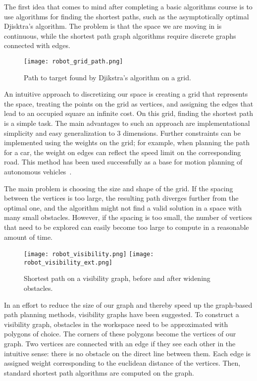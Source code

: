 The first idea that comes to mind after completing a basic algorithms course is to use algorithms for finding the shortest paths, such as the asymptotically optimal Djisktra's algorithm. The problem is that the space we are moving in is continuous, while the shortest path graph algorithms require discrete graphs connected with edges.

\begin{figure}[ht]
    \centering
    \texttt{[image: robot\_grid\_path.png]}
  \caption{Path to target found by Djikstra's algorithm on a grid.}\label{fig:grid}
\end{figure}

An intuitive approach to discretizing our space is creating a grid that represents the space, treating the points on the grid as vertices, and assigning the edges that lead to an occupied square an infinite cost. On this grid, finding the shortest path is a simple task. The main advantages to such an approach are implementational simplicity and easy generalization to 3 dimensions. Further constraints can be implemented using the weights on the grid; for example, when planning the path for a car, the weight on edges can reflect the speed limit on the corresponding road.
This method has been used successfully as a base for motion planning of autonomous vehicles~\cite{grid1, grid2}.

The main problem is choosing the size and shape of the grid. If the spacing between the vertices is too large, the resulting path diverges further from the optimal one, and the algorithm might not find a valid solution in a space with many small obstacles. However, if the spacing is too small, the number of vertices that need to be explored can easily become too large to compute in a reasonable amount of time.


\begin{figure}
  \centering
  \begin{minipage}{0.8\textwidth}
  \texttt{[image: robot\_visibility.png]}
  \texttt{[image: robot\_visibility\_ext.png]}
  \end{minipage}
  \caption{Shortest path on a visibility graph, before and after widening obstacles.}\label{fig:vis}
\end{figure}

In an effort to reduce the size of our graph and thereby speed up the graph-based path planning methods, visibility graphs have been suggested. To construct a visibility graph, obstacles in the workspace need to be approximated with polygons of choice. The corners of these polygons become the vertices of our graph. Two vertices are connected with an edge if they see each other in the intuitive sense: there is no obstacle on the direct line between them. Each edge is assigned weight corresponding to the euclidean distance of the vertices. Then, standard shortest path algorithms are computed on the graph.

